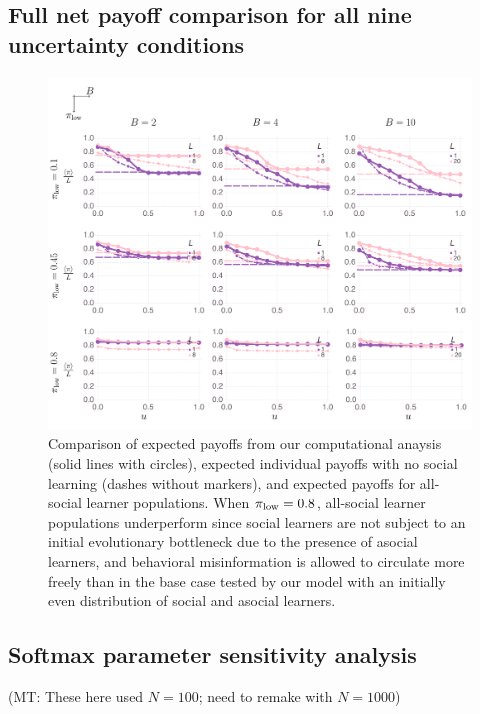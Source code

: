 \documentclass[letterpaper,11.5pt]{scrartcl}
\newcommand{\mt}[1]{{\textcolor{myorange} {({\tiny MT:} #1)}}}
\begin{document}
\newpage

\subsection{Full net payoff comparison for all nine uncertainty conditions} 

\begin{figure}
  \caption{Comparison of expected payoffs from our computational anaysis (solid
    lines with circles), expected individual payoffs with no social learning
    (dashes without markers), and expected payoffs for all-social learner 
    populations. When $\pi_{\mathrm{low}} = 0.8$, all-social learner populations underperform
    since social learners are not subject to an initial evolutionary bottleneck
    due to the presence of asocial learners, and behavioral misinformation
    is allowed to circulate more freely than in the base case tested by 
    our model with an initially even distribution of social and asocial learners.
}
  \label{fig:fullMeanPrevNetPayoffs}
  \centering
    \includegraphics[width=\textwidth]{Figures/supplement/fullMeanPrevNetPayoffs.pdf}
\end{figure}



\subsection{Softmax parameter sensitivity analysis} 

\mt{These here used $N=100$; need to remake with $N=1000$}
\end{document}
